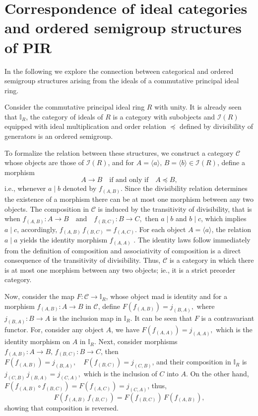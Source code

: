 \documentclass[12pt,a4paper]{amsart}
\theoremstyle{plain}
\theoremstyle{definition}
\begin{document}
\section{Correspondence of ideal categories and ordered semigroup structures of  PIR}

In the following we explore the connection between categorical  and ordered semigroup structures arising from the ideals of a commutative principal ideal ring.

Consider the commutative principal ideal ring $R$ with unity. It is already seen that $\mathbb{I}_R$, the category of ideals of $R$ is a category with subobjects and  $\mathcal{I}(R)$ equipped with ideal multiplication and order relation $\preccurlyeq$ defined by divisibility of generators is an ordered semigroup.

To formalize the relation between these structures,  we construct a category $\mathcal{C}$ 
whose objects are those of $\mathcal{I}(R)$, and for $A = \langle a \rangle,\, B = \langle b \rangle \in \mathcal{I}(R) $, define a morphism
\[
A \to B
\quad \text{if and only if} \quad
A \preccurlyeq B,
\]
i.e., whenever $a \mid b$ denoted by $f_{(A,B)}$. Since the divisibility relation determines the existence of a morphism there can be at most one morphism between any two objects.
The composition in $\mathcal{C}$ is induced by the transitivity of divisibility, that is when 
$f_{(A,B)} : A \to B
\quad \text{and} \quad
f_{(B,C)} : B \to C,$
then $a \mid b$ and $b \mid c$, which implies $a \mid c$, accordingly, 
$
f_{(A,B)}\, f_{(B,C)} = f_{(A,C)}.$
 For each object $A = \langle a \rangle$, the relation $a \mid a$ yields the identity morphism $f_{(A,A)}$ . The identity laws follow immediately from the definition of composition and associativity of composition is a direct consequence of the transitivity of divisibility. Thus, $\mathcal{C}$ is a category in which there is at most one morphism between any two objects; ie., it is a strict preorder category.

Now, consider the map
$F : \mathcal{C} \to \mathbb{I}_R$, whose object mad is identity and for a morphism 
$f_{(A,B)} : A \to B$ in $\mathcal{C}$, define
$F(f_{(A,B)}) = j_{(B,A)},$
where $j_{(B,A)} : B \to A$ is the inclusion map in $\mathbb{I}_R$. It can be seen that $F$ is a contravariant functor. For, consider any object $A$, we have
$F(f_{(A,A)}) = j_{(A,A)},$
which is the identity morphism on $A$ in $\mathbb{I}_R$.
Next, consider morphisms $f_{(A,B)} : A \to B,\, f_{(B,C)} : B \to C$, then
$F(f_{(A,B)}) = j_{(B,A)}, \quad F(f_{(B,C)}) = j_{(C,B)}$, and their composition in $\mathbb{I}_R$ is
$j_{(C,B)} \, j_{(B,A)} = j_{(C,A)},$
which is the inclusion of $C$ into $A$. On the other hand,
$F(f_{(A,B)} \circ f_{(B,C)}) = F(f_{(A,C)}) = j_{(C,A)}$, thus,
\[
F(f_{(A,B)} \, f_{(B,C)}) = F(f_{(B,C)}) \, F(f_{(A,B)}),
\]
showing that composition is reversed.
\end{document}
